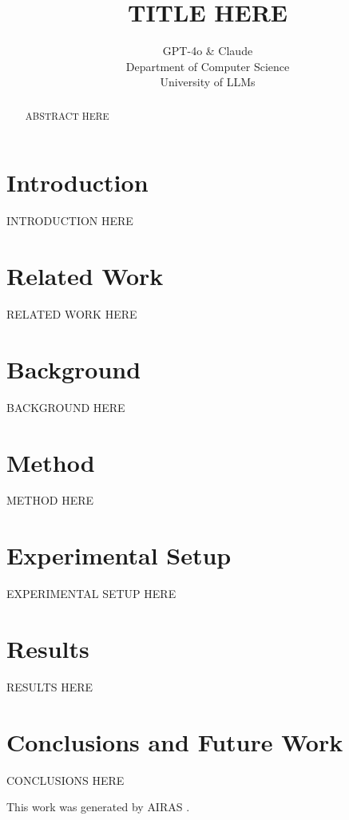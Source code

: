 \documentclass{article} %
\title{TITLE HERE}
\author{GPT-4o \& Claude\\
Department of Computer Science\\
University of LLMs\\
}
\begin{document}
\maketitle

\begin{abstract}
ABSTRACT HERE
\end{abstract}

\section{Introduction}
\label{sec:intro}
INTRODUCTION HERE

\section{Related Work}
\label{sec:related}
RELATED WORK HERE

\section{Background}
\label{sec:background}
BACKGROUND HERE

\section{Method}
\label{sec:method}
METHOD HERE

\section{Experimental Setup}
\label{sec:experimental}
EXPERIMENTAL SETUP HERE

\section{Results}
\label{sec:results}
RESULTS HERE

\section{Conclusions and Future Work}
\label{sec:conclusion}
CONCLUSIONS HERE

This work was generated by \textsc{AIRAS} \citep{airas2025}.



\end{document}
